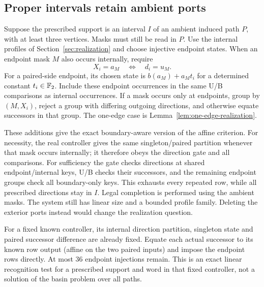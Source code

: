 \subsection{Proper intervals retain ambient ports}
\label{app:boundary-aware}
Suppose the prescribed support is an interval $I$ of an ambient induced path
$P$, with at least three vertices. Masks must still be read in $P$. Use the
internal profiles of Section~\ref{sec:realization} and choose injective endpoint
states. When an endpoint mask $M$ also occurs internally, require
\[
 X_i=a_M\quad\Longleftrightarrow\quad d_i=u_M.
\]
For a paired-side endpoint, its chosen state is $b(a_M)+a_Mt_i$ for a determined
constant $t_i\in\mathbb F_2$. Include these endpoint occurrences in the same U/B
comparisons as internal occurrences. If a mask occurs only at endpoints, group
by $(M,X_i)$, reject a group with differing outgoing directions, and otherwise
equate successors in that group. The one-edge case is Lemma~\ref{lem:one-edge-realization}.

These additions give the exact boundary-aware version of the affine criterion.
For necessity, the real controller gives the same singleton/paired partition
whenever that mask occurs internally; it therefore obeys the direction gate
and all comparisons. For sufficiency the gate checks directions at shared
endpoint/internal keys, U/B checks their successors, and the remaining endpoint
groups check all boundary-only keys. This exhausts every repeated row, while
all prescribed directions stay in $I$. Legal completion is performed using the
ambient masks. The system still has linear size and a bounded profile family.
Deleting the exterior ports instead would change the realization question.

For a fixed known controller, its internal direction partition, singleton state
and paired successor difference are already fixed. Equate each actual successor
to its known row output (affine on the two paired inputs) and impose the endpoint
rows directly. At most 36 endpoint injections remain. This is an exact linear
recognition test for a prescribed support and word in that fixed controller,
not a solution of the basin problem over all paths.

